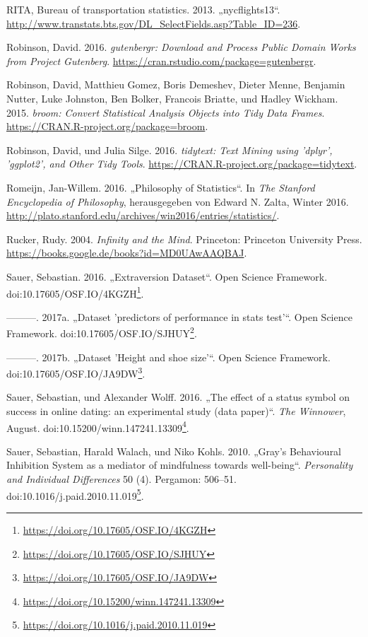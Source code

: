 \documentclass[12pt,ngerman,]{book}
\let\rmarkdownfootnote\footnote%
\def\footnote{\protect\rmarkdownfootnote}
\renewcommand{\href}[2]{#2\footnote{\url{#1}}}
\theoremstyle{definition}
\theoremstyle{definition}
\theoremstyle{remark}
\begin{document}
\hypertarget{ref-nycflights13}{}
RITA, Bureau of transportation statistics. 2013. „nycflights13``.
\url{http://www.transtats.bts.gov/DL_SelectFields.asp?Table_ID=236}.

\hypertarget{ref-R-gutenbergr}{}
Robinson, David. 2016. \emph{gutenbergr: Download and Process Public
Domain Works from Project Gutenberg}.
\url{https://cran.rstudio.com/package=gutenbergr}.

\hypertarget{ref-R-broom}{}
Robinson, David, Matthieu Gomez, Boris Demeshev, Dieter Menne, Benjamin
Nutter, Luke Johnston, Ben Bolker, Francois Briatte, und Hadley Wickham.
2015. \emph{broom: Convert Statistical Analysis Objects into Tidy Data
Frames}. \url{https://CRAN.R-project.org/package=broom}.

\hypertarget{ref-R-tidytext}{}
Robinson, David, und Julia Silge. 2016. \emph{tidytext: Text Mining
using 'dplyr', 'ggplot2', and Other Tidy Tools}.
\url{https://CRAN.R-project.org/package=tidytext}.

\hypertarget{ref-sep-statistics}{}
Romeijn, Jan-Willem. 2016. „Philosophy of Statistics``. In \emph{The
Stanford Encyclopedia of Philosophy}, herausgegeben von Edward N. Zalta,
Winter 2016.
\url{http://plato.stanford.edu/archives/win2016/entries/statistics/}.

\hypertarget{ref-ruckerinfinity}{}
Rucker, Rudy. 2004. \emph{Infinity and the Mind}. Princeton: Princeton
University Press. \url{https://books.google.de/books?id=MD0UAwAAQBAJ}.

\hypertarget{ref-Sauer_2016}{}
Sauer, Sebastian. 2016. „Extraversion Dataset``. Open Science Framework.
doi:\href{https://doi.org/10.17605/OSF.IO/4KGZH}{10.17605/OSF.IO/4KGZH}.

\hypertarget{ref-Sauer_2017}{}
---------. 2017a. „Dataset 'predictors of performance in stats test'``.
Open Science Framework.
doi:\href{https://doi.org/10.17605/OSF.IO/SJHUY}{10.17605/OSF.IO/SJHUY}.

\hypertarget{ref-Sauer_2017a}{}
---------. 2017b. „Dataset 'Height and shoe size'``. Open Science
Framework.
doi:\href{https://doi.org/10.17605/OSF.IO/JA9DW}{10.17605/OSF.IO/JA9DW}.

\hypertarget{ref-sauer_wolff}{}
Sauer, Sebastian, und Alexander Wolff. 2016. „The effect of a status
symbol on success in online dating: an experimental study (data
paper)``. \emph{The Winnower}, August.
doi:\href{https://doi.org/10.15200/winn.147241.13309}{10.15200/winn.147241.13309}.

\hypertarget{ref-sauer2010gray}{}
Sauer, Sebastian, Harald Walach, und Niko Kohls. 2010. „Gray's
Behavioural Inhibition System as a mediator of mindfulness towards
well-being``. \emph{Personality and Individual Differences} 50 (4).
Pergamon: 506--51.
doi:\href{https://doi.org/10.1016/j.paid.2010.11.019}{10.1016/j.paid.2010.11.019}.
\end{document}
